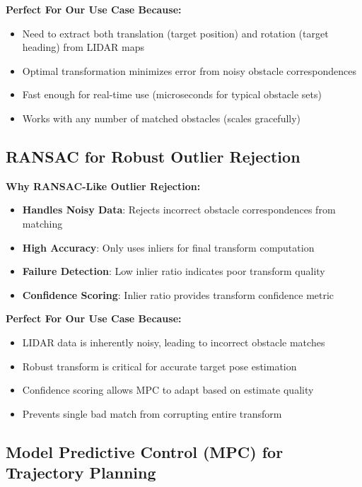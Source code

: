 \documentclass[11pt]{article}
\begin{document}
\textbf{Perfect For Our Use Case Because:}
\begin{itemize}
    \item Need to extract both translation (target position) and rotation (target heading) from LIDAR maps
    \item Optimal transformation minimizes error from noisy obstacle correspondences
    \item Fast enough for real-time use (microseconds for typical obstacle sets)
    \item Works with any number of matched obstacles (scales gracefully)
\end{itemize}

\subsection{RANSAC for Robust Outlier Rejection}

\textbf{Why RANSAC-Like Outlier Rejection:}

\begin{itemize}
    \item \textbf{Handles Noisy Data}: Rejects incorrect obstacle correspondences from matching
    \item \textbf{High Accuracy}: Only uses inliers for final transform computation
    \item \textbf{Failure Detection}: Low inlier ratio indicates poor transform quality
    \item \textbf{Confidence Scoring}: Inlier ratio provides transform confidence metric
\end{itemize}

\textbf{Perfect For Our Use Case Because:}
\begin{itemize}
    \item LIDAR data is inherently noisy, leading to incorrect obstacle matches
    \item Robust transform is critical for accurate target pose estimation
    \item Confidence scoring allows MPC to adapt based on estimate quality
    \item Prevents single bad match from corrupting entire transform
\end{itemize}

\subsection{Model Predictive Control (MPC) for Trajectory Planning}
\end{document}
